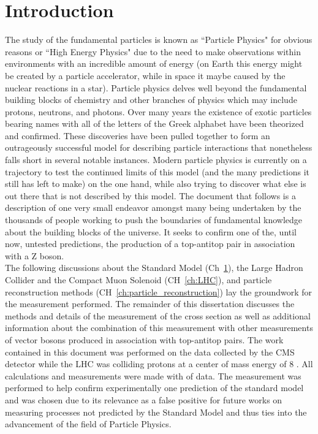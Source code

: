 \chapter{Introduction}
\label{ch:intro}     
The study of the fundamental particles is known as ``Particle Physics" for obvious reasons or ``High Energy Physics" due to the need to make observations within environments with an incredible amount of energy (on Earth this energy might be created by a particle accelerator, while in space it maybe caused by the nuclear reactions in a star). Particle physics delves well beyond the fundamental building blocks of chemistry and other branches of physics which may include protons, neutrons, and photons. Over many years the existence of exotic particles bearing names with all of the letters of the Greek alphabet have been theorized and confirmed. These discoveries have been pulled together to form an outrageously successful model for describing particle interactions that nonetheless falls short in several notable instances. Modern particle physics is currently on a trajectory to test the continued limits of this model (and the many predictions it still has left to make) on the one hand, while also trying to discover what else is out there that is not described by this model. The document that follows is a description of one very small endeavor amongst many being undertaken by the thousands of people working to push the boundaries of fundamental knowledge about the building blocks of the universe. It seeks to confirm one of the, until now, untested predictions, the production of a top-antitop pair in association with a Z boson.	\\

The following discussions about the Standard Model (Ch~\ref{ch:intro}), the Large Hadron Collider and the Compact Muon Solenoid (CH~\ref{ch:LHC}), and particle reconstruction methods (CH~\ref{ch:particle_reconstruction}) lay the groundwork for the measurement performed. The remainder of this dissertation discusses the methods and details of the measurement of the \ttZ cross section as well as additional information about the combination of this measurement with other measurements of vector bosons produced in association with top-antitop pairs. The work contained in this document was performed on the data collected by the CMS detector while the LHC was colliding protons at a center of mass energy of 8 \TeV. All calculations and measurements were made with \intLumi of data. The measurement was performed to help confirm experimentally one prediction of the standard model and was chosen due to its relevance as a false positive for future works on measuring processes not predicted by the Standard Model and thus ties into the advancement of the field of Particle Physics.
	
